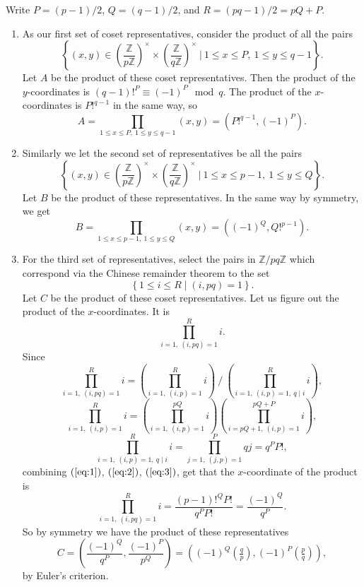 \documentclass{article}
\newcommand{\Z}{\mathbb{Z}}
\newcommand{\rb}[1]{\left( #1 \right)}
\newcommand{\cb}[1]{\left\{ #1 \right\}}
\newcommand{\legendre}[2]{\rb{\tfrac{#1}{#2}}}
\theoremstyle{definition}\newtheorem{definition}{Definition}
\theoremstyle{definition}\newtheorem{remark}[definition]{Remark}
\theoremstyle{definition}\newtheorem*{example}{Example}
\theoremstyle{definition}\newtheorem*{note}{Note}
\begin{document}
Write $ P = \rb{p - 1} / 2 $, $ Q = \rb{q - 1} / 2 $, and $ R = \rb{pq - 1} / 2 = pQ + P $.
\begin{enumerate}
\item As our first set of coset representatives, consider the product of all the pairs
$$ \cb{\rb{x, y} \in \rb{\dfrac{\Z}{p\Z}}^\times \times \rb{\dfrac{\Z}{q\Z}}^\times \ \Bigg| \ 1 \le x \le P, \ 1 \le y \le q - 1}. $$ Let $ A $ be the product of these coset representatives. Then the product of the $ y $-coordinates is $ \rb{q - 1}!^P \equiv \rb{-1}^P \mod q $. The product of the $ x $-coordinates is $ P!^{q - 1} $ in the same way, so
$$ A = \prod_{1 \le x \le P, \ 1 \le y \le q - 1} \rb{x, y} = \rb{P!^{q - 1}, \rb{-1}^P}. $$
\item Similarly we let the second set of representatives be all the pairs
$$ \cb{\rb{x, y} \in \rb{\dfrac{\Z}{p\Z}}^\times \times \rb{\dfrac{\Z}{q\Z}}^\times \ \Bigg| \ 1 \le x \le p - 1, \ 1 \le y \le Q}. $$
Let $ B $ be the product of these representatives. In the same way by symmetry, we get
$$ B = \prod_{1 \le x \le p - 1, \ 1 \le y \le Q} \rb{x, y} = \rb{\rb{-1}^Q, Q!^{p - 1}}. $$
\item For the third set of representatives, select the pairs in $ \Z / pq\Z $ which correspond via the Chinese remainder theorem to the set
$$ \cb{1 \le i \le R \mid \rb{i, pq} = 1}. $$
Let $ C $ be the product of these coset representatives. Let us figure out the product of the $ x $-coordinates. It is
$$ \prod_{i = 1, \ \rb{i, pq} = 1}^R i. $$
Since
\begin{equation}
\label{eq:1}
\prod_{i = 1, \ \rb{i, pq} = 1}^R i = \rb{\prod_{i = 1, \ \rb{i, p} = 1}^R i} \ \Bigg/ \ \rb{\prod_{i = 1, \ \rb{i, p} = 1, \ q \mid i}^R i},
\end{equation}
\begin{equation}
\label{eq:2}
\prod_{i = 1, \ \rb{i, p} = 1}^R i = \rb{\prod_{i = 1, \ \rb{i, p} = 1}^{pQ} i}\rb{\prod_{i = pQ + 1, \ \rb{i, p} = 1}^{pQ + P} i},
\end{equation}
\begin{equation}
\label{eq:3}
\prod_{i = 1, \ \rb{i, p} = 1, \ q \mid i}^{R} i = \prod_{j = 1, \ \rb{j, p} = 1}^{P} qj = q^PP!,
\end{equation}
combining $ \rb{\ref{eq:1}} $, $ \rb{\ref{eq:2}} $, $ \rb{\ref{eq:3}} $, get that the $ x $-coordinate of the product is
$$ \prod_{i = 1, \ \rb{i, pq} = 1}^R i = \dfrac{\rb{p - 1}!^QP!}{q^PP!} = \dfrac{\rb{-1}^Q}{q^P}. $$
So by symmetry we have the product of these representatives
$$ C = \rb{\dfrac{\rb{-1}^Q}{q^P}, \dfrac{\rb{-1}^P}{p^Q}} = \rb{\rb{-1}^Q\legendre{q}{p}, \rb{-1}^P\legendre{p}{q}}, $$
by Euler's criterion.
\end{enumerate}
\end{document}
